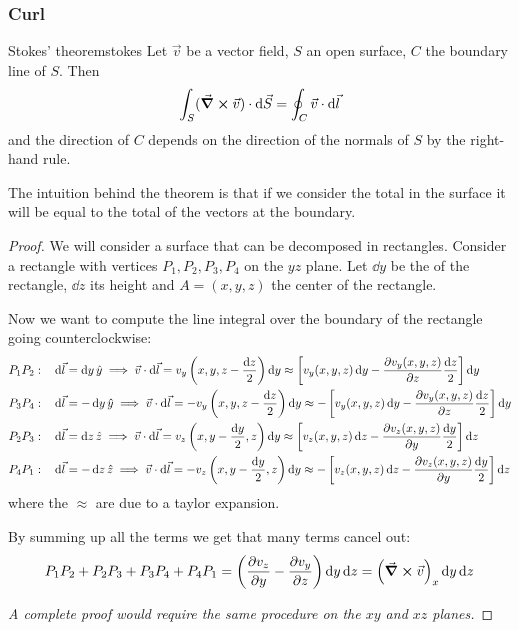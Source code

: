 \documentclass[12pt]{extarticle}
\begin{document}
\subsubsection{Curl}

\begin{theorem}{Stokes' theorem}{stokes}
    Let $\vec v$ be a vector field, $S$ an open surface, $C$ the boundary line of $S$.
    Then
    \begin{equation}
        \int_S (\curl \vec v) \cdot \dd{\vec S} = \oint_C \vec v \cdot \dd{\vec l}
    \end{equation}
    and the direction of $C$ depends on the direction of the normals of $S$ by the right-hand rule.
\end{theorem}

The intuition behind the theorem is that if we consider the total  in the surface it will be equal to the total  of the vectors at the boundary.

\begin{proof}
    We will consider a surface that can be decomposed in rectangles.
    Consider a rectangle with vertices $P_1,P_2,P_3,P_4$ on the $yz$ plane. Let $\dd{y}$ be the  of the rectangle, $\dd{z}$ its height and $A = (x, y, z)$ the center of the rectangle.

    Now we want to compute the line integral over the boundary of the rectangle going counterclockwise:
    \begin{align}
        P_1 P_2: \quad & \dd{\vec l} = \dd{y} \hat y \implies \vec v \cdot \dd{\vec l} = v_y\left(x, y, z - \frac{\dd{z}}{2}\right)\dd{y} \approx \left[v_y(x, y, z) \dd{y} - \pdv{v_y(x, y, z)}{z} \frac{\dd{z}}{2}\right] \dd{y}    \\
        P_3 P_4: \quad & \dd{\vec l} = -\dd{y} \hat y \implies \vec v \cdot \dd{\vec l} = -v_y\left(x, y, z - \frac{\dd{z}}{2}\right)\dd{y} \approx -\left[v_y(x, y, z) \dd{y} - \pdv{v_y(x, y, z)}{z} \frac{\dd{z}}{2}\right] \dd{y} \\
        P_2 P_3: \quad & \dd{\vec l} = \dd{z} \hat z \implies \vec v \cdot \dd{\vec l} = v_z\left(x, y - \frac{\dd{y}}{2}, z\right)\dd{y} \approx \left[v_z(x, y, z) \dd{z} - \pdv{v_z(x, y, z)}{y} \frac{\dd{y}}{2}\right] \dd{z}    \\
        P_4 P_1: \quad & \dd{\vec l} = -\dd{z} \hat z \implies \vec v \cdot \dd{\vec l} = -v_z\left(x, y - \frac{\dd{y}}{2}, z\right)\dd{y} \approx -\left[v_z(x, y, z) \dd{z} - \pdv{v_z(x, y, z)}{y} \frac{\dd{y}}{2}\right] \dd{z}
    \end{align}
    where the $\approx$ are due to a taylor expansion.

    By summing up all the terms we get that many terms cancel out:
    \begin{equation}
        P_1P_2 + P_2P_3 + P_3P_4 + P_4P_1 = \left( \pdv{v_z}{y} - \pdv{v_y}{z} \right) \dd{y} \dd{z} = \left( \curl \vec v \right)_x \dd{y} \dd{z}
    \end{equation}

    \textit{A complete proof would require the same procedure on the $xy$ and $xz$ planes.}
\end{proof}
\end{document}

